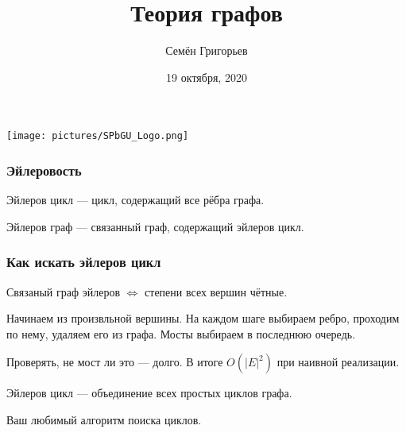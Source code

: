 \documentclass[xcolor=table]{beamer}
\title[Графы]{Теория графов}
\institute[СПбГУ]{
Санкт-Петербургский Государственный Университет
}
\author[Семён Григорьев]{Семён Григорьев}
\date{19 октября, 2020}
\begin{document}
{
\begin{frame}[fragile]
  \centering
  \texttt{[image: pictures/SPbGU\_Logo.png]}
  \titlepage
\end{frame}
}

\begin{frame} \frametitle{Эйлеровость}
  
\begin{definition}
Эйлеров цикл --- цикл, содержащий все рёбра графа.
\end{definition}

\begin{definition}
Эйлеров граф --- связанный граф, содержащий эйлеров цикл.
\end{definition}


\begin{center}
\end{center}


\end{frame}


\begin{frame} \frametitle{Как искать эйлеров цикл}
  
\begin{theorem}
Связаный граф эйлеров $\iff$ степени всех вершин чётные.
\end{theorem}
\pause
\begin{definition}
Начинаем из произвльной вершины. На каждом шаге выбираем ребро, проходим по нему, удаляем его из графа. Мосты выбираем в последнюю очередь.
\end{definition}
Проверять, не мост ли это --- долго. В итоге $O(|E|^2)$  при наивной реализации.
\pause
\begin{definition}
Эйлеров цикл --- объединение всех простых циклов графа.

Ваш любимый алгоритм поиска циклов.
\end{definition}

\end{frame}
\end{document}
